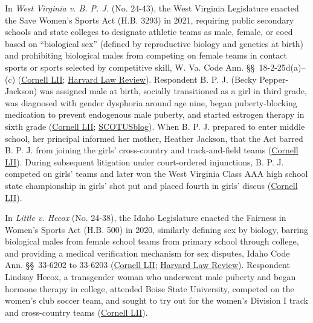 \documentclass[12pt]{article}
\begin{document}
In \textit{West Virginia v. B. P. J.} (No. 24-43), the West Virginia Legislature enacted the Save Women's Sports Act (H.B. 3293) in 2021, requiring public secondary schools and state colleges to designate athletic teams as male, female, or coed based on ``biological sex'' (defined by reproductive biology and genetics at birth) and prohibiting biological males from competing on female teams in contact sports or sports selected by competitive skill, W. Va. Code Ann. \S\S~18-2-25d(a)--(c) (\href{https://www.law.cornell.edu/supremecourt/text/24-43}{Cornell LII}; \href{https://harvardlawreview.org/print/vol-140/west-virginia-v-b-p-j-ex-rel-jackson/}{Harvard Law Review}). Respondent B. P. J. (Becky Pepper-Jackson) was assigned male at birth, socially transitioned as a girl in third grade, was diagnosed with gender dysphoria around age nine, began puberty-blocking medication to prevent endogenous male puberty, and started estrogen therapy in sixth grade (\href{https://www.law.cornell.edu/supremecourt/text/24-43}{Cornell LII}; \href{https://www.scotusblog.com/2026/06/court-rules-that-states-can-exclude-transgender-athletes-from-girls-and-womens-sports-teams/}{SCOTUSblog}). When B. P. J. prepared to enter middle school, her principal informed her mother, Heather Jackson, that the Act barred B. P. J. from joining the girls' cross-country and track-and-field teams (\href{https://www.law.cornell.edu/supremecourt/text/24-43}{Cornell LII}). During subsequent litigation under court-ordered injunctions, B. P. J. competed on girls' teams and later won the West Virginia Class AAA high school state championship in girls' shot put and placed fourth in girls' discus (\href{https://www.law.cornell.edu/supremecourt/text/24-43}{Cornell LII}).

In \textit{Little v. Hecox} (No. 24-38), the Idaho Legislature enacted the Fairness in Women's Sports Act (H.B. 500) in 2020, similarly defining sex by biology, barring biological males from female school teams from primary school through college, and providing a medical verification mechanism for sex disputes, Idaho Code Ann. \S\S~33-6202 to 33-6203 (\href{https://www.law.cornell.edu/supremecourt/text/24-43}{Cornell LII}; \href{https://harvardlawreview.org/print/vol-140/west-virginia-v-b-p-j-ex-rel-jackson/}{Harvard Law Review}). Respondent Lindsay Hecox, a transgender woman who underwent male puberty and began hormone therapy in college, attended Boise State University, competed on the women's club soccer team, and sought to try out for the women's Division I track and cross-country teams (\href{https://www.law.cornell.edu/supremecourt/text/24-43}{Cornell LII}).
\end{document}
